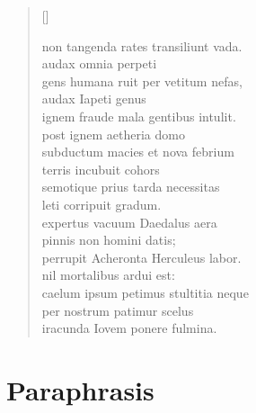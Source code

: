 \begin{verse}[\versewidth]
\begin{patverse*}
{  non tangenda rates transiliunt vada. 	\\
audax omnia perpeti\\
  gens humana ruit per vetitum nefas, 	\\
audax Iapeti genus 	\\
  ignem fraude mala gentibus intulit. 	\\
post ignem aetheria domo 	\\
  subductum macies et nova febrium\\
terris incubuit cohors 	\\
  semotique prius tarda necessitas 	\\
leti corripuit gradum. 	\\
  expertus vacuum Daedalus aera 	\\
pinnis non homini datis;\\
  perrupit Acheronta Herculeus labor. 	\\
nil mortalibus ardui est: 	\\
  caelum ipsum petimus stultitia neque 	\\
per nostrum patimur scelus 	\\
  iracunda Iovem ponere fulmina.\\
  
}
\end{patverse*}
\end{verse}

\newpage

\section*{Paraphrasis}

